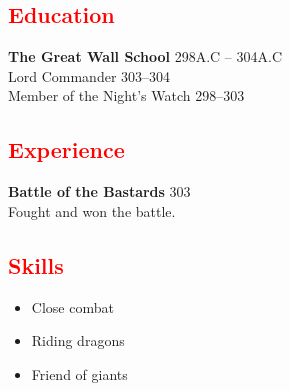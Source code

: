 \documentclass[a4paper,11pt]{article}
\begin{document}
\begin{minipage}[t]{0.6\textwidth}
    \textcolor{red}{\section*{Education}}
    \textbf{The Great Wall School} \hfill 298A.C -- 304A.C \\
    Lord Commander 303--304 \\
    Member of the Night's Watch 298--303

    \textcolor{red}{\section*{Experience}}
    \textbf{Battle of the Bastards} \hfill 303 \\
    Fought and won the battle.

    \textcolor{red}{\section*{Skills}}
    \begin{itemize}
        \item Close combat
        \item Riding dragons
        \item Friend of giants
    \end{itemize}
\end{minipage}
\end{document}
